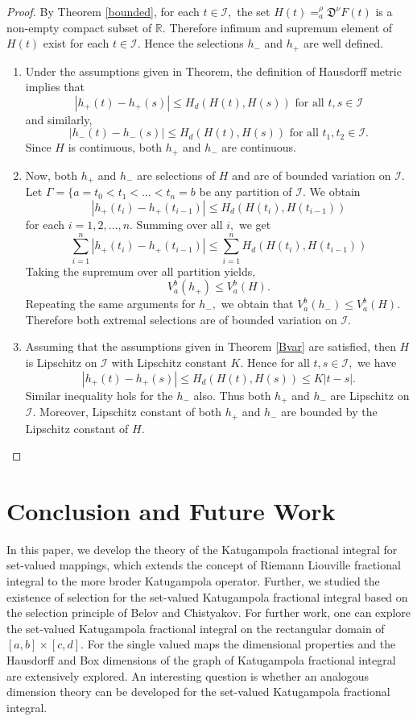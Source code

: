 \documentclass{amsproc}
\theoremstyle{definition}
\theoremstyle{remark}
\numberwithin{equation}{section}
\begin{document}
\begin{proof}
    By Theorem \ref{bounded}, for each $t \in \mathcal{I},$ the set $H(t)=_a^\rho\mathfrak{D}^\nu F(t)$ is a non-empty compact subset of $\mathbb{R}.$ Therefore infimum and supremum element of $H(t)$ exist for each $t \in \mathcal{I}.$ Hence the selections $h_-$ and $h_+$ are well defined.  
    \begin{enumerate}[label=(\alph*)]
        \item Under the assumptions given in Theorem, the definition of Hausdorff metric implies that 
        \[ |h_+(t)-h_+(s)| \le H_d(H(t),H(s)) \text{ for all } t,s \in \mathcal{I}\]
        and similarly, 
        \[ |h_-(t)-h_-(s)| \le H_d(H(t),H(s)) \text{ for all } t_1,t_2 \in \mathcal{I} .\]
        Since $H$ is continuous, both $h_+$ and $h_-$ are continuous. 
        \item Now, both $h_+$ and $h_-$ are selections of $H$ and are of bounded variation on $\mathcal{I}.$ Let $ \Gamma=\{a=t_0<t_1 <\ldots < t_n=b  $ be any partition of $\mathcal{I}.$ We obtain 
        \[ |h_+(t_i)-h_+(t_{i-1})| \le H_d(H(t_i),H(t_{i-1}))\]
        for each $i=1,2,\ldots,n.$ Summing over all $i,$ we get 
        \[ \sum_{i=1}^n |h_+(t_i)-h_+(t_{i-1})| \le \sum_{i=1}^nH_d(H(t_i),H(t_{i-1})) \]
        Taking the supremum over all partition yields, 
        \[ V_a^b(h_+)\le V_a^b(H).\]
        Repeating the same arguments for $h_-,$ we obtain that $V_a^b(h_-)\le V_a^b(H).$ Therefore both extremal selections are of bounded variation on $\mathcal{I}.$
         \item Assuming that the assumptions given in Theorem \ref{Bvar} are satisfied, then  $H$ is Lipschitz on $\mathcal{I}$ with Lipschitz constant $K.$ Hence for all $t,s \in \mathcal{I},$ we have 
         \[ |h_+(t)-h_+(s)| \le H_d(H(t),H(s)) \le K|t-s|.\]
         Similar inequality hols for the $h_-$ also. Thus both $h_+$ and $h_-$ are Lipschitz on $\mathcal{I}.$ Moreover, 
         Lipschitz constant of both $h_+$ and $h_-$ are bounded by the Lipschitz constant of $H.$ 
    \end{enumerate}
\end{proof}
\section{Conclusion and Future Work}
In this paper, we develop the theory of the Katugampola fractional integral for set-valued mappings, which extends the concept of Riemann Liouville fractional integral to the more broder Katugampola operator. Further, we studied the existence of selection for the  set-valued Katugampola fractional integral based on the selection principle of  Belov and Chistyakov. For further work, one can explore the set-valued Katugampola fractional integral on the rectangular domain of $[a,b]\times[c,d].$ For the single valued maps the dimensional properties and  the Hausdorff and Box dimensions of the graph of Katugampola fractional integral are extensively explored. An interesting question is whether an analogous dimension theory can be developed for the set-valued Katugampola fractional integral.
\end{document}
